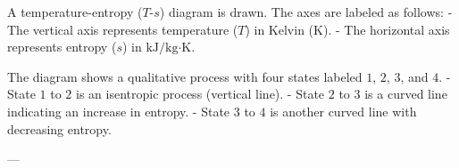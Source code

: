 A temperature-entropy (\( T \)-\( s \)) diagram is drawn. The axes are labeled as follows:  
- The vertical axis represents temperature (\( T \)) in Kelvin (\( \text{K} \)).  
- The horizontal axis represents entropy (\( s \)) in \( \text{kJ}/\text{kg·K} \).  

The diagram shows a qualitative process with four states labeled \( 1 \), \( 2 \), \( 3 \), and \( 4 \).  
- State \( 1 \) to \( 2 \) is an isentropic process (vertical line).  
- State \( 2 \) to \( 3 \) is a curved line indicating an increase in entropy.  
- State \( 3 \) to \( 4 \) is another curved line with decreasing entropy.  

---